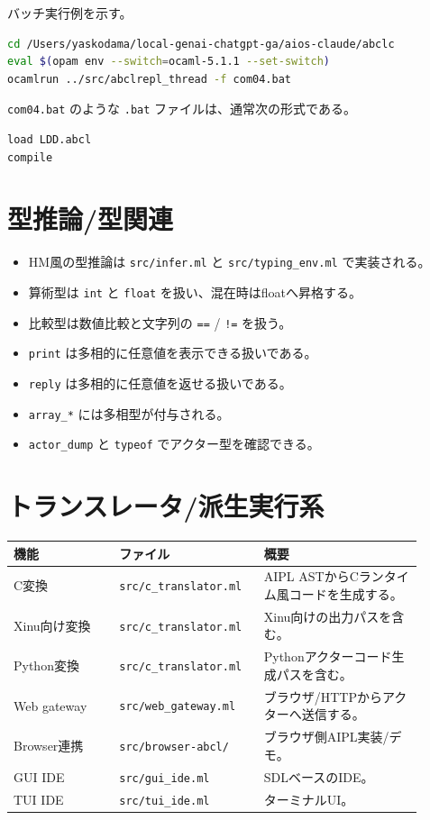 \documentclass[11pt,a4paper,uplatex,dvipdfmx]{jsarticle}
\begin{document}
バッチ実行例を示す。

\begin{lstlisting}[style=aipl,language=bash]
cd /Users/yaskodama/local-genai-chatgpt-ga/aios-claude/abclc
eval $(opam env --switch=ocaml-5.1.1 --set-switch)
ocamlrun ../src/abclrepl_thread -f com04.bat
\end{lstlisting}

\texttt{com04.bat} のような \texttt{.bat} ファイルは、通常次の形式である。

\begin{lstlisting}[style=aipl]
load LDD.abcl
compile
\end{lstlisting}

\section{型推論/型関連}

\begin{itemize}
  \item HM風の型推論は \texttt{src/infer.ml} と \texttt{src/typing\_env.ml} で実装される。
  \item 算術型は \texttt{int} と \texttt{float} を扱い、混在時はfloatへ昇格する。
  \item 比較型は数値比較と文字列の \texttt{==} / \texttt{!=} を扱う。
  \item \texttt{print} は多相的に任意値を表示できる扱いである。
  \item \texttt{reply} は多相的に任意値を返せる扱いである。
  \item \texttt{array\_*} には多相型が付与される。
  \item \texttt{actor\_dump} と \texttt{typeof} でアクター型を確認できる。
\end{itemize}

\section{トランスレータ/派生実行系}

\begin{longtable}{p{0.24\linewidth}p{0.30\linewidth}p{0.36\linewidth}}
\toprule
機能 & ファイル & 概要 \\
\midrule
C変換 & \texttt{src/c\_translator.ml} & AIPL ASTからCランタイム風コードを生成する。 \\
Xinu向け変換 & \texttt{src/c\_translator.ml} & Xinu向けの出力パスを含む。 \\
Python変換 & \texttt{src/c\_translator.ml} & Pythonアクターコード生成パスを含む。 \\
Web gateway & \texttt{src/web\_gateway.ml} & ブラウザ/HTTPからアクターへ送信する。 \\
Browser連携 & \texttt{src/browser-abcl/} & ブラウザ側AIPL実装/デモ。 \\
GUI IDE & \texttt{src/gui\_ide.ml} & SDLベースのIDE。 \\
TUI IDE & \texttt{src/tui\_ide.ml} & ターミナルUI。 \\
\bottomrule
\end{longtable}
\end{document}
